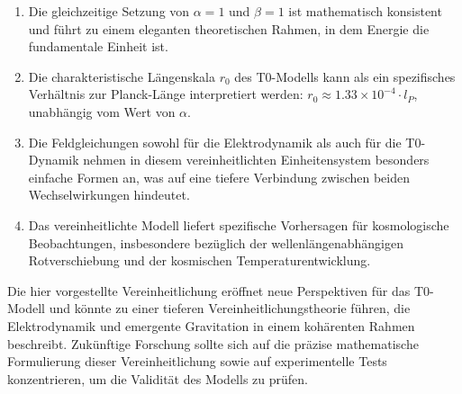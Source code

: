 \documentclass[12pt,a4paper]{article}
\begin{document}
	\begin{enumerate}
		\item Die gleichzeitige Setzung von $\alpha = 1$ und $\beta = 1$ ist mathematisch konsistent und führt zu einem eleganten theoretischen Rahmen, in dem Energie die fundamentale Einheit ist.
		
		\item Die charakteristische Längenskala $r_0$ des T0-Modells kann als ein spezifisches Verhältnis zur Planck-Länge interpretiert werden: $r_0 \approx 1.33 \times 10^{-4} \cdot l_P$, unabhängig vom Wert von $\alpha$.
		
		\item Die Feldgleichungen sowohl für die Elektrodynamik als auch für die T0-Dynamik nehmen in diesem vereinheitlichten Einheitensystem besonders einfache Formen an, was auf eine tiefere Verbindung zwischen beiden Wechselwirkungen hindeutet.
		
		\item Das vereinheitlichte Modell liefert spezifische Vorhersagen für kosmologische Beobachtungen, insbesondere bezüglich der wellenlängenabhängigen Rotverschiebung und der kosmischen Temperaturentwicklung.
	\end{enumerate}
	
	Die hier vorgestellte Vereinheitlichung eröffnet neue Perspektiven für das T0-Modell und könnte zu einer tieferen Vereinheitlichungstheorie führen, die Elektrodynamik und emergente Gravitation in einem kohärenten Rahmen beschreibt. Zukünftige Forschung sollte sich auf die präzise mathematische Formulierung dieser Vereinheitlichung sowie auf experimentelle Tests konzentrieren, um die Validität des Modells zu prüfen.
	
\end{document}
